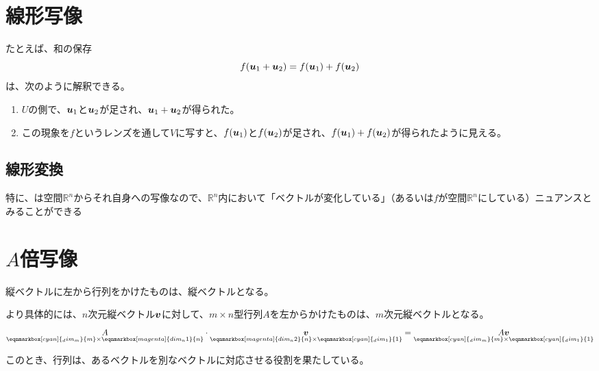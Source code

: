 \documentclass[../../../topic_linear-algebra]{subfiles}
\begin{document}
\sectionline
\section{線形写像}

たとえば、和の保存
\begin{equation*}
  f(\vb*{u}_1 + \vb*{u}_2) = f(\vb*{u}_1) + f(\vb*{u}_2)
\end{equation*}
は、次のように解釈できる。

\begin{enumerate}
  \item $U$の側で、$\vb*{u}_1$と$\vb*{u}_2$が足され、$\vb*{u}_1 + \vb*{u}_2$が得られた。
  \item この現象を$f$というレンズを通して$V$に写すと、$f(\vb*{u}_1)$と$f(\vb*{u}_2)$が足され、$f(\vb*{u}_1) + f(\vb*{u}_2)$が得られたように見える。
\end{enumerate}

\subsection{線形変換}

特に、は空間$\mathbb{R}^n$からそれ自身への写像なので、$\mathbb{R}^n$内において「ベクトルが変化している」（あるいは$f$が空間$\mathbb{R}^n$にしている）ニュアンスとみることができる

\sectionline
\section{$A$倍写像}

縦ベクトルに左から行列をかけたものは、縦ベクトルとなる。

より具体的には、$n$次元縦ベクトル$\vb*{v}$に対して、$m \times n$型行列$A$を左からかけたものは、$m$次元縦ベクトルとなる。
\begin{equation*}
  \underset{\eqnmarkbox[cyan]{_dim_m}{m} \times \eqnmarkbox[magenta]{dim_n1}{n}}{A} \cdot \underset{\eqnmarkbox[magenta]{dim_n2}{n} \times \eqnmarkbox[cyan]{_dim_1}{1}}{\vb*{v}} = \underset{\eqnmarkbox[cyan]{_dim_m}{m} \times \eqnmarkbox[cyan]{_dim_1}{1}}{A \vb*{v}}
\end{equation*}

このとき、行列は、あるベクトルを別なベクトルに対応させる役割を果たしている。
\end{document}
